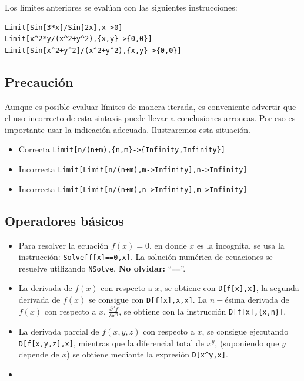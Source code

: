    Los límites anteriores se evalúan con las siguientes instrucciones:
    \begin{tcolorbox}
\begin{Verbatim}[formatcom=\letraverbatim]
Limit[Sin[3*x]/Sin[2x],x->0]
Limit[x^2*y/(x^2+y^2),{x,y}->{0,0}]
Limit[Sin[x^2+y^2]/(x^2+y^2),{x,y}->{0,0}]
\end{Verbatim}
    \end{tcolorbox}

    \subsection{Precaución}
    Aunque es posible evaluar límites de manera iterada, es conveniente advertir que el uso
    incorrecto de esta sintaxis puede llevar a conclusiones arroneas.
    Por eso es importante usar la indicación adecuada. Ilustraremos esta situación.
    \begin{itemize}
      \item Correcta {\small \verb"Limit[n/(n+m),{n,m}->{Infinity,Infinity}]"}
      \item Incorrecta {\small \verb"Limit[Limit[n/(n+m),m->Infinity],n->Infinity]"}
      \item Incorrecta {\small \verb"Limit[Limit[n/(n+m),n->Infinity],m->Infinity]"}
    \end{itemize}

    \subsection{Operadores básicos}
     
    \begin{itemize}
      \item Para resolver la ecuación $f(x)=0$, en donde $x$ es la incognita, se usa la
        instrucción: \verb"Solve[f[x]==0,x]". La solución numérica de ecuaciones se resuelve utilizando \verb"NSolve".
        \textbf{No olvidar:} ``\verb"=="''.
      \item La derivada de $f(x)$ con respecto a $x$, se obtiene con \verb"D[f[x],x]",
        la segunda derivada de $f(x)$ se consigue con \verb"D[f[x],x,x]".
        La $n-$ésima derivada de $f(x)$ con respecto a $x$, $\frac{\partial^n f}{\partial x^n}$, se obtiene con la instrucción
        \verb"D[f[x],{x,n}]".
      \item La derivada parcial de $f(x,y,z)$ con respecto a $x$, se consigue ejecutando \verb"D[f[x,y,z],x]", mientras que
        la diferencial total de $x^y$, (suponiendo que $y$ depende de $x$) se obtiene mediante la expresión
        \verb"D[x^y,x]". 
      \item {}
    \end{itemize}

